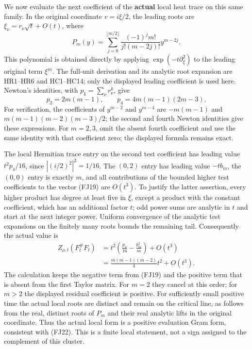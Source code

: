 \documentclass[
  10pt,
  a4paper,
]{article}
\begin{document}
We now evaluate the next coefficient of the \textbf{actual} local heat
trace on this same family. In the original coordinate \(v=i\xi/2\), the
leading roots are \(\xi_\nu=r_\nu\sqrt t+O(t)\), where \[
P_m(y)=\sum_{j=0}^{\lfloor m/2\rfloor}
 \frac{(-1)^j m!}{j!(m-2j)!}y^{m-2j}.
\tag{FJ20}
\] This polynomial is obtained directly by applying
\(\exp(-t\partial_\xi^2)\) to the leading original term \(\xi^m\). The
full-unit derivation and its analytic root expansion are HR1--HR6 and
HC1--HC14; only the displayed leading coefficient is used here. Newton's
identities, with \(p_k=\sum_\nu r_\nu^k\), give \[
p_2=2m(m-1),\qquad p_4=4m(m-1)(2m-3).
\tag{FJ21}
\] For verification, the coefficients of \(y^{m-2}\) and \(y^{m-4}\) are
\(-m(m-1)\) and \(m(m-1)(m-2)(m-3)/2\); the second and fourth Newton
identities give these expressions. For \(m=2,3\), omit the absent fourth
coefficient and use the same identity with that coefficient zero; the
displayed formula remains exact.

The local Hermitian trace entry on the second test coefficient has
leading value \(t^2p_4/16\), since \(|(i/2)^2|^2=1/16\). The \((0,2)\)
entry has leading value \(-tb_m\), the \((0,0)\) entry is exactly \(m\),
and all contributions of the bounded higher test coefficients to the
vector (FJ19) are \(O(t^3)\). To justify the latter assertion, every
higher product has degree at least five in \(\xi\), except a product
with the constant coefficient, which has an additional factor \(t\); odd
power sums are analytic in \(t\) and start at the next integer power.
Uniform convergence of the analytic test expansions on the finitely many
roots bounds the remaining tail. Consequently the actual value is \[
\begin{aligned}
Z_{\rho,t}(F_t^\#F_t)
&=t^2\left(\frac{p_4}{16}-\frac{b_m^2}{m}\right)+O(t^3)\\
&=\frac{m(m-1)(m-2)}4t^2+O(t^3).
\end{aligned}
\tag{FJ22}
\] The calculation keeps the negative term from (FJ19) and the positive
term that is absent from the first Taylor matrix. For \(m=2\) they
cancel at this order; for \(m>2\) the displayed residual coefficient is
positive. For sufficiently small positive time the actual local roots
are distinct and remain on the critical line, as follows from the real,
distinct roots of \(P_m\) and their real analytic lifts in the original
coordinate. Thus the actual local form is a positive evaluation Gram
form, consistent with (FJ22). This is a finite local statement, not a
sign assigned to the complement of this cluster.
\end{document}
